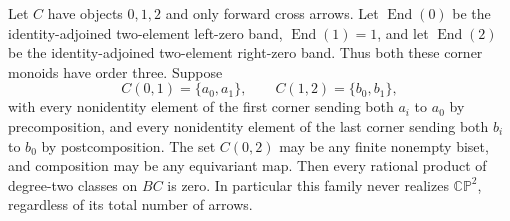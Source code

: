 \begin{theorem}
\label{C:affine-chart-family-zero}
Let $C$ have objects $0,1,2$ and only forward cross arrows.
Let $\operatorname{End}(0)$ be the identity-adjoined two-element
left-zero band,
$\operatorname{End}(1)=1$, and let
$\operatorname{End}(2)$ be the identity-adjoined two-element
right-zero band.  Thus both these corner monoids have order three.
Suppose
\[
 C(0,1)=\{a_0,a_1\},\qquad C(1,2)=\{b_0,b_1\},
\]
with every nonidentity element of the first corner sending
both $a_i$ to $a_0$ by precomposition, and every nonidentity
element of the last corner sending both $b_i$ to $b_0$ by
postcomposition.  The set $C(0,2)$ may be any finite nonempty
biset, and composition may be any equivariant map.
Then every rational product of degree-two classes on $BC$ is
zero.  In particular this family never realizes
$\mathbb {CP}^2$, regardless of its total number of arrows.
\end{theorem}
